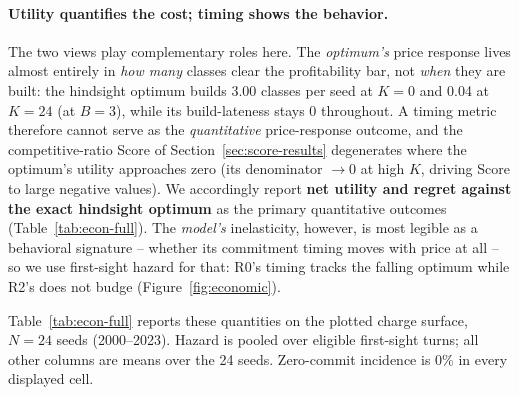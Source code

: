 \documentclass{article}
\begin{document}
\paragraph{Utility quantifies the cost; timing shows the behavior.} The two views play complementary roles here. The \emph{optimum's} price response lives almost entirely in \emph{how many} classes clear the profitability bar, not \emph{when} they are built: the hindsight optimum builds 3.00 classes per seed at $K=0$ and 0.04 at $K=24$ (at $B=3$), while its build-lateness stays 0 throughout. A timing metric therefore cannot serve as the \emph{quantitative} price-response outcome, and the competitive-ratio Score of Section~\ref{sec:score-results} degenerates where the optimum's utility approaches zero (its denominator $\to 0$ at high $K$, driving Score to large negative values). We accordingly report \textbf{net utility and regret against the exact hindsight optimum} as the primary quantitative outcomes (Table~\ref{tab:econ-full}). The \emph{model's} inelasticity, however, is most legible as a behavioral signature -- whether its commitment timing moves with price at all -- so we use first-sight hazard for that: R0's timing tracks the falling optimum while R2's does not budge (Figure~\ref{fig:economic}).

Table~\ref{tab:econ-full} reports these quantities on the plotted charge surface, $N=24$ seeds (2000--2023). Hazard is pooled over eligible first-sight turns; all other columns are means over the 24 seeds. Zero-commit incidence is 0\% in every displayed cell.
\end{document}
